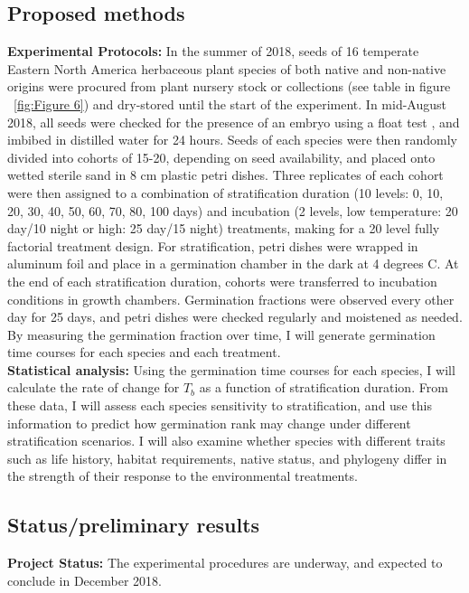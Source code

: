 \documentclass{article}\usepackage[]{graphicx}\usepackage[]{color}
\begin{document}
\subsection*{Proposed methods}
\indent\indent\textbf{Experimental Protocols:} In the summer of 2018, seeds of 16 temperate Eastern North America herbaceous plant species of both native and non-native origins were procured from plant nursery stock or collections (see table in figure ~\ref{fig:Figure 6}) and dry-stored until the start of the experiment. In mid-August 2018, all seeds were checked for the presence of an embryo using a float test \citep{Baskin2014}, and imbibed in distilled water for 24 hours. Seeds of each species were then randomly divided into cohorts of 15-20, depending on seed availability, and placed onto wetted sterile sand in 8 cm plastic petri dishes. Three replicates of each cohort were then assigned to a combination of stratification duration (10 levels: 0, 10, 20, 30, 40, 50, 60, 70, 80, 100 days) and incubation (2 levels, low temperature: 20 day/10 night or high: 25 day/15 night) treatments, making for a 20 level fully factorial treatment design. For stratification, petri dishes were wrapped in aluminum foil and place in a germination chamber in the dark at 4 degrees C. At the end of each stratification duration, cohorts were transferred to incubation conditions in growth chambers. Germination fractions were observed every other day for 25 days, and petri dishes were checked regularly and moistened as needed. By measuring the germination fraction over time, I will generate germination time courses for each species and each treatment.\\
\textbf{Statistical analysis:} Using the germination time courses for each species, I will calculate the rate of change for $T_b$ as a function of stratification duration. From these data, I will assess each species sensitivity to stratification, and use this information to predict how germination rank may change under different stratification scenarios. I will also examine whether species with different traits such as life history, habitat requirements, native status, and phylogeny differ in the strength of their response to the environmental treatments.\\
\subsection*{Status/preliminary results}
\textbf{Project Status:} The experimental procedures are underway, and expected to conclude in December 2018.\\
\end{document}
